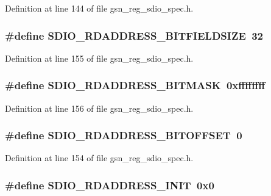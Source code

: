 Definition at line 144 of file gsn\_\-reg\_\-sdio\_\-spec.h.

\hypertarget{a00571_a6aaa72c4051c95eb50af167d037da8f9}{
\subsubsection[{SDIO\_\-RDADDRESS\_\-BITFIELDSIZE}]{\setlength{\rightskip}{0pt plus 5cm}\#define SDIO\_\-RDADDRESS\_\-BITFIELDSIZE~32}}
\label{a00571_a6aaa72c4051c95eb50af167d037da8f9}


Definition at line 155 of file gsn\_\-reg\_\-sdio\_\-spec.h.

\hypertarget{a00571_a4642d5852a8d62463e484eee908f3749}{
\subsubsection[{SDIO\_\-RDADDRESS\_\-BITMASK}]{\setlength{\rightskip}{0pt plus 5cm}\#define SDIO\_\-RDADDRESS\_\-BITMASK~0xffffffff}}
\label{a00571_a4642d5852a8d62463e484eee908f3749}


Definition at line 156 of file gsn\_\-reg\_\-sdio\_\-spec.h.

\hypertarget{a00571_a786d97e9d8dab6b24e0bfb35b8dd9f5d}{
\subsubsection[{SDIO\_\-RDADDRESS\_\-BITOFFSET}]{\setlength{\rightskip}{0pt plus 5cm}\#define SDIO\_\-RDADDRESS\_\-BITOFFSET~0}}
\label{a00571_a786d97e9d8dab6b24e0bfb35b8dd9f5d}


Definition at line 154 of file gsn\_\-reg\_\-sdio\_\-spec.h.

\hypertarget{a00571_a243b48381b4a4ac28a76315abbc18fc2}{
\subsubsection[{SDIO\_\-RDADDRESS\_\-INIT}]{\setlength{\rightskip}{0pt plus 5cm}\#define SDIO\_\-RDADDRESS\_\-INIT~0x0}}
\label{a00571_a243b48381b4a4ac28a76315abbc18fc2}


